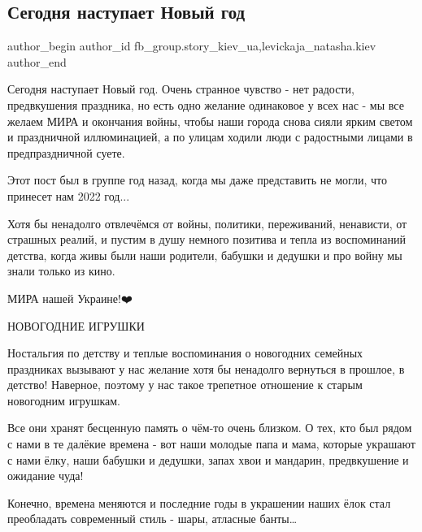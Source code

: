  
 
 
 
 
 
\subsection{Сегодня наступает Новый год}
\label{sec:31_12_2022.fb.fb_group.story_kiev_ua.1.novyj_god_igrushki}
 
\ifcmt
 author_begin
   author_id fb_group.story_kiev_ua,levickaja_natasha.kiev
 author_end
\fi

Сегодня наступает Новый год. Очень странное чувство - нет радости, предвкушения
праздника, но есть одно желание одинаковое у всех нас - мы все желаем МИРА и
окончания войны,  чтобы наши города снова сияли ярким светом и праздничной
иллюминацией, а по улицам ходили люди с радостными лицами в предпраздничной
суете.

Этот пост был  в группе год назад, когда мы даже представить не могли, что
принесет нам 2022 год...

Хотя  бы ненадолго отвлечёмся от войны, политики, переживаний, ненависти, от
страшных реалий, и пустим в душу немного позитива и тепла из воспоминаний
детства, когда живы были наши родители, бабушки и дедушки и про войну мы знали
только из кино.

МИРА нашей Украине!❤️💛💙

НОВОГОДНИЕ ИГРУШКИ

Ностальгия по детству и теплые воспоминания о новогодних семейных праздниках
вызывают у нас желание хотя бы ненадолго вернуться в прошлое, в детство!
Наверное, поэтому у нас  такое трепетное отношение к старым новогодним
игрушкам.

Все они  хранят бесценную память  о чём-то  очень  близком. О тех, кто был
рядом с нами в те далёкие времена - вот наши молодые папа и мама, которые
украшают с нами ёлку, наши бабушки и дедушки, запах хвои и мандарин,
предвкушение и ожидание чуда!

Конечно, времена меняются и  последние годы в украшении наших ёлок стал
преобладать современный стиль - шары, атласные банты…

